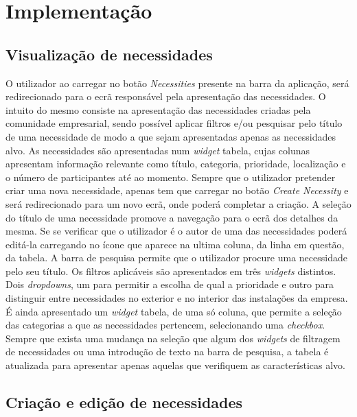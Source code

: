 \documentclass[a4paper,openright,12pt]{report}
\begin{document}
\section*{Implementação}

\subsection{Visualização de necessidades} \label{secNecessities}

O utilizador ao carregar no botão \textit{Necessities} presente na barra da aplicação, será redirecionado para o ecrã responsável pela apresentação das necessidades. 
O intuito do mesmo consiste na apresentação das necessidades criadas pela comunidade empresarial, sendo possível aplicar filtros e/ou pesquisar pelo título de uma necessidade de modo a que sejam apresentadas apenas as necessidades alvo.
As necessidades são apresentadas num \textit{widget} tabela, cujas colunas apresentam informação relevante como título, categoria, prioridade, localização e o número de participantes até ao momento. Sempre que o utilizador pretender criar uma nova necessidade, apenas tem que carregar no botão \textit{Create Necessity} e será redirecionado para um novo ecrã, onde poderá completar a criação.
A seleção do título de uma necessidade promove a navegação para o ecrã dos detalhes da mesma. Se se verificar que o utilizador é o autor de uma das necessidades poderá editá-la carregando no ícone que aparece na ultima coluna, da linha em questão, da tabela.
A barra de pesquisa permite que o utilizador procure uma necessidade pelo seu título.
Os filtros aplicáveis são apresentados em três \textit{widgets} distintos. Dois \textit{dropdowns}, um para permitir a escolha de qual a prioridade e outro para distinguir entre necessidades no exterior e no interior das instalações da empresa.
É ainda apresentado um \textit{widget} tabela, de uma só coluna, que permite a seleção das categorias a que as necessidades pertencem, selecionando uma \textit{checkbox}.  
Sempre que exista uma mudança na seleção que algum dos \textit{widgets} de filtragem de necessidades ou uma introdução de texto na barra de pesquisa, a tabela é atualizada para apresentar apenas aquelas que verifiquem as características alvo. 

\subsection{Criação e edição de necessidades}\label{secNecessityCreation}
\end{document}
